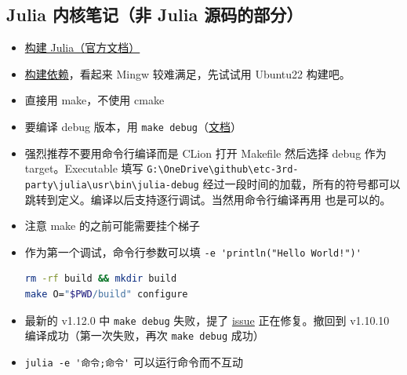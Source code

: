 \subsection{Julia 内核笔记（非 Julia 源码的部分）}
\begin{itemize}
\item \href{https://docs.julialang.org/en/v1/devdocs/build/build/}{构建 Julia（官方文档）}
\item \href{https://docs.julialang.org/en/v1/devdocs/build/build/#Required-Build-Tools-and-External-Libraries}{构建依赖}，看起来 Mingw 较难满足，先试试用 Ubuntu22 构建吧。
\item 直接用 make，不使用 cmake
\item 要编译 debug 版本，用 \verb`make debug`（\href{https://docs.julialang.org/en/v1/devdocs/backtraces/}{文档}）
\item 强烈推荐不要用命令行编译而是 CLion 打开 Makefile 然后选择 debug 作为 target。Executable 填写 \verb`G:\OneDrive\github\etc-3rd-party\julia\usr\bin\julia-debug` 经过一段时间的加载，所有的符号都可以跳转到定义。编译以后支持逐行调试。当然用命令行编译再用  也是可以的。
\item 注意 make 的之前可能需要挂个梯子
\item 作为第一个调试，命令行参数可以填 \verb`-e 'println("Hello World!")'`
\begin{lstlisting}[language=bash]
rm -rf build && mkdir build
make O="$PWD/build" configure
\end{lstlisting}
\item 最新的 v1.12.0 中 \verb`make debug` 失败，提了 \href{https://github.com/JuliaLang/julia/issues/57675}{issue} 正在修复。撤回到 v1.10.10 编译成功（第一次失败，再次 \verb`make debug` 成功）
\item \verb`julia -e '命令;命令'` 可以运行命令而不互动
\end{itemize}

